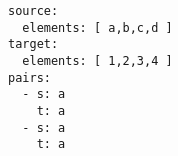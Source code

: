 \par\begin{minipage}{60ex}
\begin{verbatim}
source:
  elements: [ a,b,c,d ]
target:
  elements: [ 1,2,3,4 ]
pairs:
  - s: a
    t: a
  - s: a
    t: a

\end{verbatim}
\end{minipage}\par